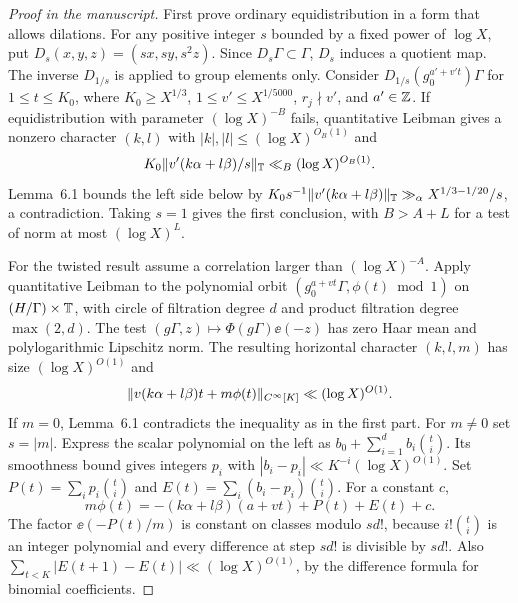 \begin{proof}[Proof in the manuscript]
\leanok
First prove ordinary equidistribution in a form that allows
dilations. For any positive integer $s$ bounded by a fixed power of
$\log X$, put $D_s(x,y,z)=(sx,sy,s^2z)$. Since
$D_s\Gamma\subset\Gamma$, $D_s$ induces a quotient map. The inverse
$D_{1/s}$ is applied to group elements only. Consider
$D_{1/s}(g_0^{a'+v't})\Gamma$ for $1\le t\le K_0$, where
$K_0\ge X^{1/3}$, $1\le v'\le X^{1/5000}$, $r_j\nmid v'$,
and $a'\in\mathbb Z$. If equidistribution with parameter
$(\log X)^{-B}$ fails, quantitative Leibman gives a nonzero
character $(k,l)$ with $|k|,|l|\le(\log X)^{O_B(1)}$ and
\[
 K_0\lVert v'(k\alpha+l\beta)/s\rVert_{\mathbb T}\ll_B(\log X)^{O_B(1)} .
\]
Lemma~6.1 bounds the left side below by
$K_0s^{-1}\lVert v'(k\alpha+l\beta)\rVert_{\mathbb T}
\gg_\alpha X^{1/3-1/20}/s$, a contradiction.
Taking $s=1$ gives the first conclusion, with $B>A+L$ for a test
of norm at most $(\log X)^L$.

For the twisted result assume a correlation larger than
$(\log X)^{-A}$. Apply quantitative Leibman to the polynomial
orbit $(g_0^{a+vt}\Gamma,\phi(t)\bmod1)$ on
$(H/\Gamma)\times\mathbb T$, with circle of filtration degree $d$
and product filtration degree $\max(2,d)$.
The test $(g\Gamma,z)\mapsto\Phi(g\Gamma)\ee(-z)$ has zero
Haar mean and polylogarithmic Lipschitz norm. The resulting
horizontal character $(k,l,m)$ has size $(\log X)^{O(1)}$ and
\[
 \lVert v(k\alpha+l\beta)t+m\phi(t)\rVert_{C^\infty[K]}
 \ll(\log X)^{O(1)}.
\]
If $m=0$, Lemma~6.1 contradicts the inequality as in the first
part. For $m\ne0$ set $s=|m|$. Express the scalar polynomial
on the left as $b_0+\sum_{i=1}^d b_i\binom{t}{i}$.
Its smoothness bound gives integers $p_i$ with
$|b_i-p_i|\ll K^{-i}(\log X)^{O(1)}$.
Set $P(t)=\sum_i p_i\binom{t}{i}$ and
$E(t)=\sum_i(b_i-p_i)\binom{t}{i}$. For a constant $c$,
\[
 m\phi(t)=-(k\alpha+l\beta)(a+vt)+P(t)+E(t)+c .
\]
The factor $\ee(-P(t)/m)$ is constant on classes modulo $sd!$,
because $i!\binom{t}{i}$ is an integer polynomial and every
difference at step $sd!$ is divisible by $sd!$.
Also
$\sum_{t<K}|E(t+1)-E(t)|\ll(\log X)^{O(1)}$,
by the difference formula for binomial coefficients.


\end{proof}
